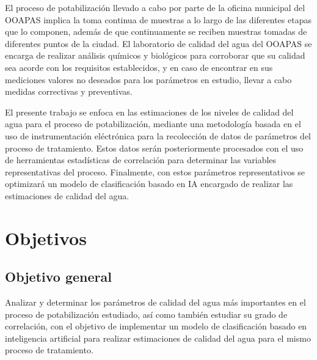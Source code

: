 El proceso de potabilización llevado a cabo por parte de la oficina municipal del OOAPAS
implica la toma continua de muestras a lo largo de las diferentes etapas que lo componen,
además de que continuamente se reciben muestras tomadas de diferentes puntos de la ciudad.
El laboratorio de calidad del agua del OOAPAS se encarga de realizar análisis químicos y biológicos
para corroborar que su calidad sea acorde con los requisitos establecidos, y en caso de encontrar en
sus mediciones valores no deseados para los parámetros en estudio, llevar a cabo medidas correctivas 
y preventivas. 

El presente trabajo se enfoca en las estimaciones de los niveles de calidad del agua para el proceso de potabilización, mediante una metodología basada en el uso de instrumentación eléctrónica para la recolección de datos 
de parámetros del proceso de tratamiento. Estos datos serán posteriormente procesados con el uso de herramientas estadísticas de correlación para determinar las variables representativas del proceso. Finalmente, con estos
parámetros representativos se optimizará un modelo de clasificación basado en IA encargado de realizar las estimaciones de calidad del agua.

\section{Objetivos}

\subsection{Objetivo general}


Analizar y determinar los parámetros de calidad del agua más importantes en el proceso de potabilización estudiado, así como también estudiar su grado de correlación, con el objetivo de implementar un modelo de clasificación 
basado en inteligencia artificial para realizar estimaciones de calidad del agua para el mismo proceso de tratamiento. 
 

